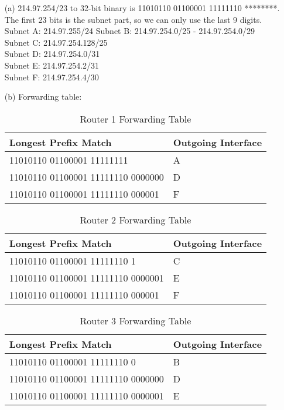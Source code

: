 \documentclass[12pt,a4paper]{article}
\begin{document}
\begin{enumerate}
    \item [(a)] 
        214.97.254/23 to 32-bit binary is 11010110 01100001 11111110 ********.\\
        The first 23 bits is the subnet part, so we can only use the last 9 digits.\\
        Subnet A: 214.97.255/24
        Subnet B: 214.97.254.0/25 - 214.97.254.0/29 \\
        Subnet C: 214.97.254.128/25 \\
        Subnet D: 214.97.254.0/31 \\
        Subnet E: 214.97.254.2/31 \\
        Subnet F: 214.97.254.4/30
    \newpage
    \item[(b)]
        Forwarding table:
        \begin{table}[!ht]
            \centering
            \begin{tabular}{|l|l|}
            \hline
                Longest Prefix Match & Outgoing Interface \\ \hline
                11010110 01100001 11111111 & A \\ \hline
                11010110 01100001 11111110 0000000 & D \\ \hline
                11010110 01100001 11111110 000001  & F \\ \hline
            \end{tabular}
            \caption{Router 1 Forwarding Table}
        \end{table}

        \begin{table}[!ht]
            \centering
            \begin{tabular}{|l|l|}
            \hline
                Longest Prefix Match & Outgoing Interface \\ \hline
                11010110 01100001 11111110 1 & C \\ \hline
                11010110 01100001 11111110 0000001 & E \\ \hline
                11010110 01100001 11111110 000001  & F \\ \hline
            \end{tabular}
            \caption{Router 2 Forwarding Table}
        \end{table}

        \begin{table}[!ht]
            \centering
            \begin{tabular}{|l|l|}
            \hline
                Longest Prefix Match & Outgoing Interface \\ \hline
                11010110 01100001 11111110 0 & B \\ \hline
                11010110 01100001 11111110 0000000 & D \\ \hline
                11010110 01100001 11111110 0000001  & E \\ \hline
            \end{tabular}
            \caption{Router 3 Forwarding Table}
        \end{table}

\end{enumerate}
\end{document}

